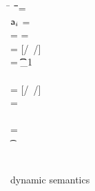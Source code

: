 \documentclass[acmsmall, anonymous, authordraft, review]{acmart} %
\begin{document}
%
\begin{figure}[!h]
\noindent\hrulefill


\medskip
\small

\begin{minipage}{\textwidth}
\small        
\begin{tabbing}
  \K\HS \New{} \HS\HS\HS\= \s~ \HS\HS \=\Red\HS\HS \= \K \HS\= \ap \HS\HS\= \sp\HS\HS \= \WHERE\HS\= \fresh\ap \HS\HS\HS\HS\HS\HS\HS\HS\=  \sp = {\Map{}}
\\
\K\HS \FReadR\a{\f[i]} \> \s           \>\Red\>     \K \>$\a[i]$ \> \s  \> \WHERE \>\App\s\a=\obj{}
\\
\K\HS {\FWriteR\a{\f[i]}\ap} \> \s     \>\Red\>     \K \> \ap \> \sp \>  \WHERE \>\App\s\a=\obj{} \HS  \> \sp = \Map{}
\\
\K\HS{\KCall\a\m\ap\t\tp} \> \s      \>\Red\>     \K \>  \ep \> \s \> \WHERE\> \ep = {[\a/\this~{\ap/\x}]\e} \HS \> \Mdef\m{}\e\In \App\K\C  \\ \> \> \> \> \> \> \>  \App\s\a=\obj{} \> \StrSub {\emptyset}\K\t {\t_{1}} \\ 
\> \> \> \> \> \> \> \StrSub {\emptyset} \tp
\\
 \K\HS {\DynCall\a\m\ap}\> \s        \>\Red\>    \K \> \ep \> \s \>  \WHERE\> \ep = {[\a/\this~{\ap/\x}]\e}\HS \> \Mdef\m\x\any\any\e \In \App\K\C \\ \> \> \> \> \> \> \> \App\s\a=\obj{} 
\\
 \K\HS {\SubCast \any\a} \> \s       \>\Red\>   \K \> \a \> \s
\\
 \K\HS {\SubCast \D\a} \> \s        \>\Red\>    \K \> \a \> \s \>  \WHERE\> \StrSub {\emptyset}\K\C \D \>\App\s\a=\obj{} 
\\
 \K\HS {\BehCast \t\a} \> \s         \>\Red\>   \Kp \> \ap \> \sp \> \WHERE\> \behcast \a\t\s\K \Kp\ap\sp    
\\
\K \HS \EM{\EE[\e]} \> \s            \>\Red\>   \Kp \> \EM{\EE[\ep]} \> \sp \> \WHERE \> \K~\e~\s \Red~\Kp~\ep~\sp
\end{tabbing}
\end{minipage}

\medskip

\hrulefill
\caption{\kafka dynamic semantics}\label{fig:semantics}
\end{figure}
\end{document}
